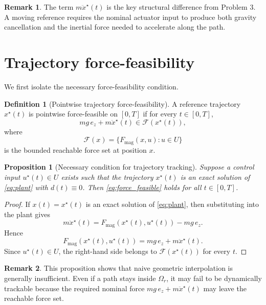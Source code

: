 \documentclass[11pt]{article}
\newtheorem{proposition}{Proposition}
\theoremstyle{definition}
\newtheorem{definition}{Definition}
\newtheorem{remark}{Remark}
\begin{document}
\begin{remark}
The term $m\ddot x^\star(t)$ is the key structural difference from Problem 3. A moving reference requires the nominal actuator input to produce both gravity cancellation and the inertial force needed to accelerate along the path.
\end{remark}

\section{Trajectory force-feasibility}

We first isolate the necessary force-feasibility condition.

\begin{definition}[Pointwise trajectory force-feasibility]
A reference trajectory $x^\star(t)$ is pointwise force-feasible on $[0,T]$ if for every $t\in[0,T]$,
\begin{equation}
 mg\,e_z + m\ddot x^\star(t) \in \mathcal{F}(x^\star(t)),
 \label{eq:force_feasible}
\end{equation}
where
\[
\mathcal{F}(x)=\{F_{\mathrm{mag}}(x,u):u\in U\}
\]
is the bounded reachable force set at position $x$.
\end{definition}

\begin{proposition}[Necessary condition for trajectory tracking]
Suppose a control input $u^\star(t)\in U$ exists such that the trajectory $x^\star(t)$ is an exact solution of \eqref{eq:plant} with $d(t)\equiv 0$. Then \eqref{eq:force_feasible} holds for all $t\in[0,T]$.
\end{proposition}

\begin{proof}
If $x(t)=x^\star(t)$ is an exact solution of \eqref{eq:plant}, then substituting into the plant gives
\[
 m\ddot x^\star(t) = F_{\mathrm{mag}}(x^\star(t),u^\star(t)) - mg\,e_z.
\]
Hence
\[
 F_{\mathrm{mag}}(x^\star(t),u^\star(t)) = mg\,e_z + m\ddot x^\star(t).
\]
Since $u^\star(t)\in U$, the right-hand side belongs to $\mathcal{F}(x^\star(t))$ for every $t$.
\end{proof}

\begin{remark}
This proposition shows that naive geometric interpolation is generally insufficient. Even if a path stays inside $\Omega_r$, it may fail to be dynamically trackable because the required nominal force $mg\,e_z+m\ddot x^\star(t)$ may leave the reachable force set.
\end{remark}
\end{document}

